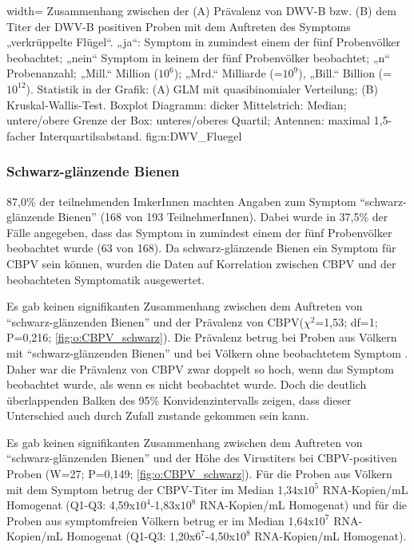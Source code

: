  
  {width=\textwidth} %
  {Zusammenhang zwischen der (A) Prävalenz von DWV-B bzw. (B) dem Titer der DWV-B positiven Proben mit dem Auftreten des Symptoms „verkrüppelte Flügel“. „ja“: Symptom in zumindest einem der fünf Probenvölker beobachtet; „nein“ Symptom in keinem der fünf Probenvölker beobachtet; „n“ Probenanzahl; „Mill.“ Million ($10^6$); „Mrd.“ Milliarde (=$10^9$), „Bill.“ Billion (=$10^{12}$). Statistik in der Grafik: (A) GLM mit quasibinomialer Verteilung; (B) Kruskal-Wallis-Test. Boxplot Diagramm: dicker Mittelstrich: Median; untere/obere Grenze der Box: unteres/oberes Quartil; Antennen: maximal 1,5-facher Interquartilsabstand.} %
  {} %
  {fig:n:DWV_Fluegel} %

\subsubsection{Schwarz-glänzende Bienen}

87,0\% der teilnehmenden ImkerInnen machten Angaben zum Symptom \enquote{schwarz-glänzende Bienen} (168 von 193 TeilnehmerInnen). Dabei wurde in 37,5\% der Fälle angegeben, dass das Symptom in zumindest einem der fünf Probenvölker beobachtet wurde (63 von 168). Da schwarz-glänzende Bienen ein Symptom für CBPV sein können, wurden die Daten auf Korrelation zwischen CBPV und der beobachteten Symptomatik ausgewertet.
 
 Es gab keinen signifikanten Zusammenhang zwischen dem Auftreten von \enquote{schwarz-glänzenden Bienen} und der Prävalenz von CBPV($\chi^2$=1,53; df=1; P=0,216; \cref{fig:o:CBPV_schwarz}). Die Prävalenz betrug bei Proben aus Völkern mit \enquote{schwarz-glänzenden Bienen}  und bei Völkern ohne beobachtetem Symptom . Daher war die Prävalenz von CBPV zwar doppelt so hoch, wenn das Symptom beobachtet wurde, als wenn es nicht beobachtet wurde. Doch die deutlich überlappenden Balken des 95\% Konvidenzintervalls zeigen, dass dieser Unterschied auch durch Zufall zustande gekommen sein kann.
 
 Es gab keinen signifikanten Zusammenhang zwischen dem Auftreten von \enquote{schwarz-glänzenden Bienen} und der Höhe des Virustiters bei CBPV-positiven Proben (W=27; P=0,149; \cref{fig:o:CBPV_schwarz}). Für die Proben aus Völkern mit dem Symptom betrug der CBPV-Titer im Median 1,34x$10^5$ RNA-Kopien/\si{\milli\liter} Homogenat (Q1-Q3: 4,59x$10^4$-1,83x$10^8$ RNA-Kopien/\si{\milli\liter} Homogenat) und für die Proben aus symptomfreien Völkern betrug er im Median 1,64x$10^7$ RNA-Kopien/\si{\milli\liter} Homogenat (Q1-Q3: 1,20x$6^7$-4,50x$10^8$ RNA-Kopien/\si{\milli\liter} Homogenat).
 
